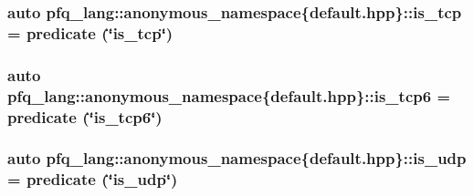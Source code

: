 \hypertarget{namespacepfq__lang_1_1anonymous__namespace_02default_8hpp_03_a219c50fd572a25336a32e00cf527c565}{
\subsubsection[{is\-\_\-tcp}]{\setlength{\rightskip}{0pt plus 5cm}auto pfq\-\_\-lang\-::anonymous\-\_\-namespace\{default.\-hpp\}\-::is\-\_\-tcp = {\bf predicate} (\char`\"{}is\-\_\-tcp\char`\"{})}}\label{namespacepfq__lang_1_1anonymous__namespace_02default_8hpp_03_a219c50fd572a25336a32e00cf527c565}
\hypertarget{namespacepfq__lang_1_1anonymous__namespace_02default_8hpp_03_a096d3a0faa81e83be5cfeb025526275d}{
\subsubsection[{is\-\_\-tcp6}]{\setlength{\rightskip}{0pt plus 5cm}auto pfq\-\_\-lang\-::anonymous\-\_\-namespace\{default.\-hpp\}\-::is\-\_\-tcp6 = {\bf predicate} (\char`\"{}is\-\_\-tcp6\char`\"{})}}\label{namespacepfq__lang_1_1anonymous__namespace_02default_8hpp_03_a096d3a0faa81e83be5cfeb025526275d}
\hypertarget{namespacepfq__lang_1_1anonymous__namespace_02default_8hpp_03_a120b37089690955fc25203beb98f0fe7}{
\subsubsection[{is\-\_\-udp}]{\setlength{\rightskip}{0pt plus 5cm}auto pfq\-\_\-lang\-::anonymous\-\_\-namespace\{default.\-hpp\}\-::is\-\_\-udp = {\bf predicate} (\char`\"{}is\-\_\-udp\char`\"{})}}\label{namespacepfq__lang_1_1anonymous__namespace_02default_8hpp_03_a120b37089690955fc25203beb98f0fe7}
